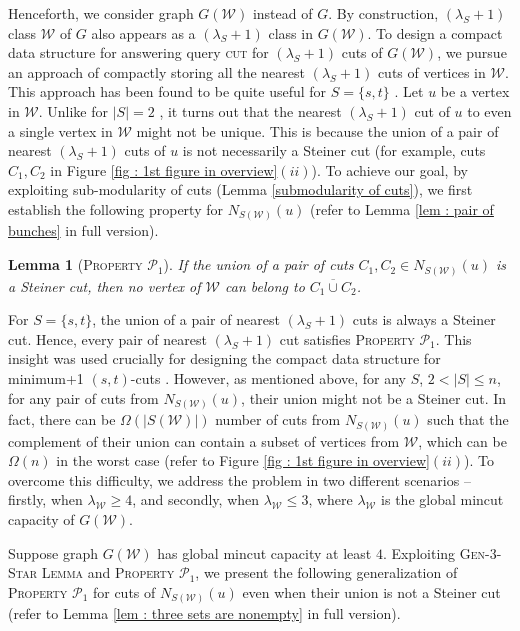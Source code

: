 \documentclass[letterpaper,11pt]{article}
\newtheorem{lemma}{Lemma}[]
\begin{document}
\noindent
Henceforth, we consider graph $G({\mathcal W})$ instead of $G$. By construction, $(\lambda_S+1)$ class ${\mathcal W}$ of $G$ also appears as a $(\lambda_S+1)$ class in $G({\mathcal W})$. To design a compact data structure for answering query \textsc{cut} for $(\lambda_S+1)$ cuts of $G({\mathcal W})$, we pursue an approach of compactly storing all the nearest $(\lambda_S+1)$ cuts of vertices in ${\mathcal W}$. This approach has been found to be quite useful for $S=\{s,t\}$ \cite{DBLP:journals/talg/BaswanaBP23}.  
 Let $u$ be a vertex in ${\mathcal W}$. Unlike for $|S|=2$ \cite{DBLP:journals/talg/BaswanaBP23}, it turns out that the nearest $(\lambda_S+1)$ cut of $u$ to even a single vertex in ${\mathcal W}$ might not be unique. This is because the union of a pair of nearest $(\lambda_S+1)$ cuts of $u$ is not necessarily a Steiner cut (for example, cuts $C_1,C_2$ in Figure \ref{fig : 1st figure in overview}$(ii)$). 
To achieve our goal, by exploiting sub-modularity of cuts (Lemma \ref{submodularity of cuts}), we first establish the following property for $N_{S({\mathcal W})}(u)$ (refer to Lemma \ref{lem : pair of bunches} in full version).  
\begin{lemma} [\textsc{Property ${\mathcal P}_1$}]
    If the union of a pair of cuts $C_1,C_2\in N_{S({\mathcal W})}(u)$ is a Steiner cut, then no vertex of ${\mathcal W}$ can belong to ${\overline{C_1\cup C_2}}$.
\end{lemma}
 For $S=\{s,t\}$, the union of a pair of nearest $(\lambda_S+1)$ cuts is always a Steiner cut. Hence, every pair of nearest $(\lambda_S+1)$ cut satisfies \textsc{Property ${\mathcal P}_1$}.  
 This insight was used crucially for designing the compact data structure for minimum+1 $(s,t)$-cuts \cite{DBLP:journals/talg/BaswanaBP23}. However, as mentioned above, for any $S$, $2< |S|\le n$, for any pair of cuts from $N_{S({\mathcal W})}(u)$, their union might not be a Steiner cut. In fact, there can be $\Omega(|S({\mathcal W})|)$ number of cuts from $N_{S({\mathcal W})}(u)$ such that the complement of their union can contain a subset of vertices from ${\mathcal W}$, which can be $\Omega(n)$ in the worst case (refer to Figure \ref{fig : 1st figure in overview}$(ii)$). To overcome this difficulty, we address the problem in two different scenarios -- firstly, when $\lambda_{\mathcal W}\ge 4$, and secondly, when $\lambda_{\mathcal W} \le 3$, where $\lambda_{\mathcal W}$ is the global mincut capacity of $G({\mathcal W})$.

Suppose graph $G({\mathcal W})$ has global mincut capacity at least $4$. Exploiting \textsc{Gen-3-Star Lemma} and \textsc{Property ${\mathcal P}_1$}, we present the following generalization of \textsc{Property ${\mathcal P}_1$} for cuts of $N_{S({\mathcal W})}(u)$ even when their union is not a Steiner cut (refer to Lemma \ref{lem : three sets are nonempty} in full version). 
\end{document}
